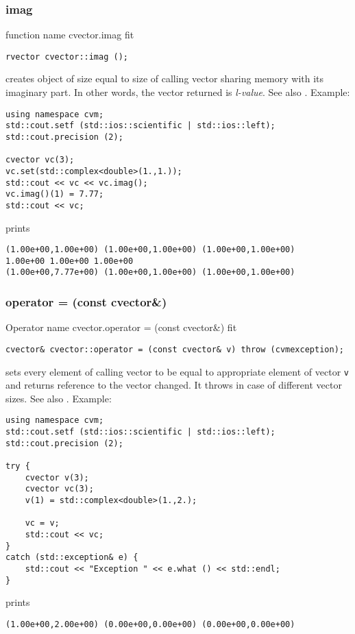 \subsubsection{imag}
function%
\pdfdest name {cvector.imag} fit
\begin{verbatim}
rvector cvector::imag ();
\end{verbatim}
creates   object
of size equal to  size of  calling vector
sharing  memory with its imaginary part.
In other words, the vector returned is  \emph{l-value}.
See also .
Example:
\begin{Verbatim}
using namespace cvm;
std::cout.setf (std::ios::scientific | std::ios::left);
std::cout.precision (2);

cvector vc(3);
vc.set(std::complex<double>(1.,1.));
std::cout << vc << vc.imag();
vc.imag()(1) = 7.77;
std::cout << vc;
\end{Verbatim}
prints
\begin{Verbatim}
(1.00e+00,1.00e+00) (1.00e+00,1.00e+00) (1.00e+00,1.00e+00)
1.00e+00 1.00e+00 1.00e+00
(1.00e+00,7.77e+00) (1.00e+00,1.00e+00) (1.00e+00,1.00e+00)
\end{Verbatim}
\newpage



\subsubsection{operator = (const cvector\&)}
Operator%
\pdfdest name {cvector.operator = (const cvector&)} fit
\begin{verbatim}
cvector& cvector::operator = (const cvector& v) throw (cvmexception);
\end{verbatim}
sets every element of  calling vector to be equal to
appropriate element of  vector \verb"v"
and returns  reference to
the vector changed.
It throws  
in case of different vector sizes.
See also .
Example:
\begin{Verbatim}
using namespace cvm;
std::cout.setf (std::ios::scientific | std::ios::left);
std::cout.precision (2);

try {
    cvector v(3);
    cvector vc(3);
    v(1) = std::complex<double>(1.,2.);

    vc = v;
    std::cout << vc;
}
catch (std::exception& e) {
    std::cout << "Exception " << e.what () << std::endl;
}
\end{Verbatim}
prints
\begin{Verbatim}
(1.00e+00,2.00e+00) (0.00e+00,0.00e+00) (0.00e+00,0.00e+00)
\end{Verbatim}
\newpage




